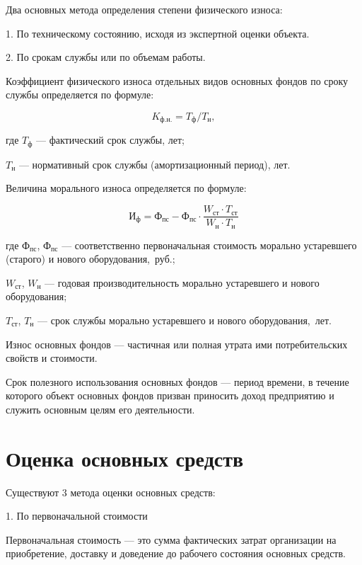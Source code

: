 Два основных метода определения степени физического износа:

1. По техническому состоянию, исходя из экспертной оценки объекта.

2. По срокам службы или по объемам работы.

Коэффициент физического износа отдельных видов основных фондов по сроку службы
определяется по формуле:

\begin{equation}
    K_{\text{ф.н.}} = T_{\text{ф}}/T_{\text{н}},
\end{equation}

где $T_{\text{ф}}$ --- фактический срок службы, лет;

$T_{\text{н}}$ --- нормативный срок службы (амортизационный период), лет.

Величина морального износа определяется по формуле:

\begin{equation}
    \text{И}_{\text{ф}} = \text{Ф}_{\text{пс}} - \text{Ф}_{\text{пс}} \cdot
    \frac{W_{\text{ст}} \cdot T_{\text{ст}}}{W_{\text{н}} \cdot T_{\text{н}}}
\end{equation}

где $\text{Ф}_{\text{пс}}$, $\text{Ф}_{\text{пс}}$ --- соответственно
первоначальная стоимость морально устаревшего (старого) и нового
оборудования,~руб.;

$W_{\text{ст}}$, $W_{\text{н}}$ --- годовая производительность морально
устаревшего и нового оборудования;

$T_{\text{ст}}$, $T_{\text{н}}$ --- срок службы морально устаревшего и нового
оборудования,~лет.

Износ основных фондов --- частичная или полная утрата ими потребительских
свойств и стоимости.

Срок полезного использования основных фондов --- период времени, в течение
которого объект основных фондов призван приносить доход предприятию и служить
основным целям его деятельности.


\section{Оценка основных средств}

Существуют 3 метода оценки основных средств:

1. По первоначальной стоимости

Первоначальная стоимость --- это сумма фактических затрат организации на
приобретение, доставку и доведение до рабочего состояния основных средств.

